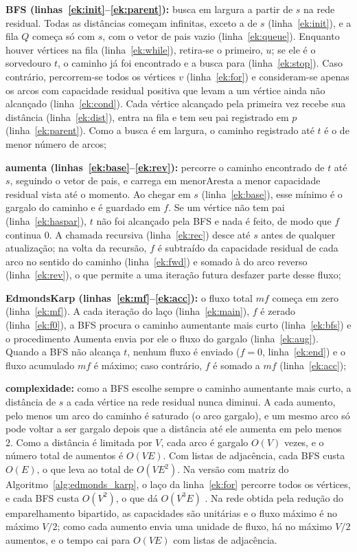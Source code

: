 \begin{alineas}
    \item \textbf{BFS (linhas~\ref{ek:init}--\ref{ek:parent}):} busca em largura a partir de $s$ na rede residual. Todas as distâncias começam infinitas, exceto a de $s$ (linha~\ref{ek:init}), e a fila $Q$ começa só com $s$, com o vetor de pais vazio (linha~\ref{ek:queue}). Enquanto houver vértices na fila (linha~\ref{ek:while}), retira-se o primeiro, $u$; se ele é o sorvedouro $t$, o caminho já foi encontrado e a busca para (linha~\ref{ek:stop}). Caso contrário, percorrem-se todos os vértices $v$ (linha~\ref{ek:for}) e consideram-se apenas os arcos com capacidade residual positiva que levam a um vértice ainda não alcançado (linha~\ref{ek:cond}). Cada vértice alcançado pela primeira vez recebe sua distância (linha~\ref{ek:dist}), entra na fila e tem seu pai registrado em $p$ (linha~\ref{ek:parent}). Como a busca é em largura, o caminho registrado até $t$ é o de menor número de arcos;
    \item \textbf{aumenta (linhas~\ref{ek:base}--\ref{ek:rev}):} percorre o caminho encontrado de $t$ até $s$, seguindo o vetor de pais, e carrega em $\text{menorAresta}$ a menor capacidade residual vista até o momento. Ao chegar em $s$ (linha~\ref{ek:base}), esse mínimo é o gargalo do caminho e é guardado em $f$. Se um vértice não tem pai (linha~\ref{ek:haspar}), $t$ não foi alcançado pela BFS e nada é feito, de modo que $f$ continua $0$. A chamada recursiva (linha~\ref{ek:rec}) desce até $s$ antes de qualquer atualização; na volta da recursão, $f$ é subtraído da capacidade residual de cada arco no sentido do caminho (linha~\ref{ek:fwd}) e somado à do arco reverso (linha~\ref{ek:rev}), o que permite a uma iteração futura desfazer parte desse fluxo;
    \item \textbf{EdmondsKarp (linhas~\ref{ek:mf}--\ref{ek:acc}):} o fluxo total $mf$ começa em zero (linha~\ref{ek:mf}). A cada iteração do laço (linha~\ref{ek:main}), $f$ é zerado (linha~\ref{ek:f0}), a BFS procura o caminho aumentante mais curto (linha~\ref{ek:bfs}) e o procedimento Aumenta envia por ele o fluxo do gargalo (linha~\ref{ek:aug}). Quando a BFS não alcança $t$, nenhum fluxo é enviado ($f = 0$, linha~\ref{ek:end}) e o fluxo acumulado $mf$ é máximo; caso contrário, $f$ é somado a $mf$ (linha~\ref{ek:acc});
    \item \textbf{complexidade:} como a BFS escolhe sempre o caminho aumentante mais curto, a distância de $s$ a cada vértice na rede residual nunca diminui. A cada aumento, pelo menos um arco do caminho é saturado (o arco gargalo), e um mesmo arco só pode voltar a ser gargalo depois que a distância até ele aumenta em pelo menos 2. Como a distância é limitada por $V$, cada arco é gargalo $O(V)$ vezes, e o número total de aumentos é $O(VE)$. Com listas de adjacência, cada BFS custa $O(E)$, o que leva ao total de $O(VE^2)$. Na versão com matriz do Algoritmo~\ref{alg:edmonds_karp}, o laço da linha~\ref{ek:for} percorre todos os vértices, e cada BFS custa $O(V^2)$, o que dá $O(V^3E)$ \cite{halim}. Na rede obtida pela redução do emparelhamento bipartido, as capacidades são unitárias e o fluxo máximo é no máximo $V/2$; como cada aumento envia uma unidade de fluxo, há no máximo $V/2$ aumentos, e o tempo cai para $O(VE)$ com listas de adjacência.

\end{alineas}
